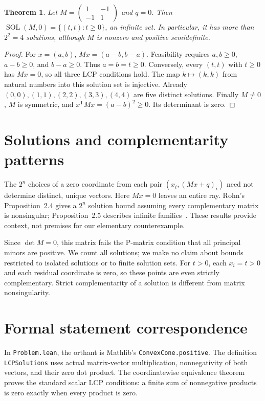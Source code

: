 \documentclass[11pt]{article}
\newtheorem{theorem}{Theorem}
\newcommand{\SOL}{\operatorname{SOL}}
\begin{document}
\begin{theorem}\label{counter}
Let $M=\left(\begin{smallmatrix}1&-1\\-1&1\end{smallmatrix}\right)$ and $q=0$. Then
$\SOL(M,0)=\{(t,t):t\geq0\}$, an infinite set. In particular, it has more than $2^2=4$ solutions, although $M$ is nonzero and positive semidefinite.
\end{theorem}
\begin{proof}
For $x=(a,b)$, $Mx=(a-b,b-a)$. Feasibility requires $a,b\geq0$, $a-b\geq0$, and $b-a\geq0$. Thus $a=b=t\geq0$. Conversely, every $(t,t)$ with $t\geq0$ has $Mx=0$, so all three LCP conditions hold.
The map $k\mapsto(k,k)$ from natural numbers into this solution set is injective. Already $(0,0),(1,1),(2,2),(3,3),(4,4)$ are five distinct solutions.
Finally $M\ne0$, $M$ is symmetric, and $x^{\mathsf T}Mx=(a-b)^2\geq0$. Its determinant is zero.
\end{proof}

\clearpage
\section{Solutions and complementarity patterns}
The $2^n$ choices of a zero coordinate from each pair $(x_i,(Mx+q)_i)$ need not determine distinct, unique vectors. Here $Mx=0$ leaves an entire ray. Rohn's Proposition~2.4 gives a $2^n$ solution bound assuming every complementary matrix is nonsingular; Proposition~2.5 describes infinite families~\cite{rohn}. These results provide context, not premises for our elementary counterexample.

Since $\det M=0$, this matrix fails the P-matrix condition that all principal minors are positive. We count all solutions; we make no claim about bounds restricted to isolated solutions or to finite solution sets. For $t>0$, each $x_i=t>0$ and each residual coordinate is zero, so these points are even strictly complementary. Strict complementarity of a solution is different from matrix nonsingularity.

\section{Formal statement correspondence}
In \texttt{Problem.lean}, the orthant is Mathlib's \texttt{ConvexCone.positive}. The definition \texttt{LCPSolutions} uses actual matrix-vector multiplication, nonnegativity of both vectors, and their zero dot product. The coordinatewise equivalence theorem proves the standard scalar LCP conditions: a finite sum of nonnegative products is zero exactly when every product is zero.
\end{document}
